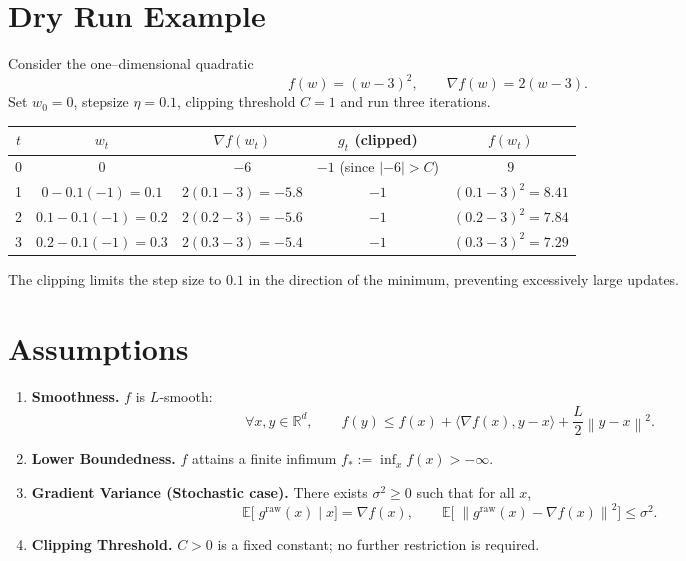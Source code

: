 \documentclass{article}
\newcommand{\norm}[1]{\left\lVert#1\right\rVert}
\newcommand{\E}{\mathbb{E}}
\begin{document}
\section*{Dry Run Example}
Consider the one–dimensional quadratic 
\[
f(w)=(w-3)^2,
\qquad \nabla f(w)=2(w-3).
\]
Set $w_0=0$, stepsize $\eta=0.1$, clipping threshold $C=1$ and run three
iterations.

\begin{center}
\begin{tabular}{c|c|c|c|c}
$t$ & $w_t$ & $\nabla f(w_t)$ & $g_t$ (clipped) & $f(w_t)$\\ \hline
0 & $0$ & $-6$ & $-1$ (since $|{-6}|>C$) & $9$\\
1 & $0-0.1(-1)=0.1$ & $2(0.1-3)=-5.8$ & $-1$ & $(0.1-3)^2=8.41$\\
2 & $0.1-0.1(-1)=0.2$ & $2(0.2-3)=-5.6$ & $-1$ & $(0.2-3)^2=7.84$\\
3 & $0.2-0.1(-1)=0.3$ & $2(0.3-3)=-5.4$ & $-1$ & $(0.3-3)^2=7.29$
\end{tabular}
\end{center}
The clipping limits the step size to $0.1$ in the direction of the
minimum, preventing excessively large updates.

\section*{Assumptions}
\begin{enumerate}[label={A\arabic*},leftmargin=*,itemsep=2pt]
\item \textbf{Smoothness.} $f$ is $L$‑smooth:
\[
\forall x,y\in\mathbb{R}^d,\qquad 
f(y)\le f(x)+\langle\nabla f(x),y-x\rangle+\frac{L}{2}\norm{y-x}^2 .
\tag{A1}
\]
\item \textbf{Lower Boundedness.} $f$ attains a finite infimum 
$f_*:=\inf_{x} f(x)>-\infty$.
\item \textbf{Gradient Variance (Stochastic case).}
There exists $\sigma^2\ge0$ such that for all $x$,
\[
\E\!\bigl[\;g^{\text{raw}}(x)\mid x\bigr]=\nabla f(x),\qquad
\E\!\bigl[\;\norm{g^{\text{raw}}(x)-\nabla f(x)}^2\bigr]\le\sigma^2 .
\tag{A3}
\]
\item \textbf{Clipping Threshold.} $C>0$ is a fixed constant; no further
restriction is required.
\end{enumerate}

\end{document}
